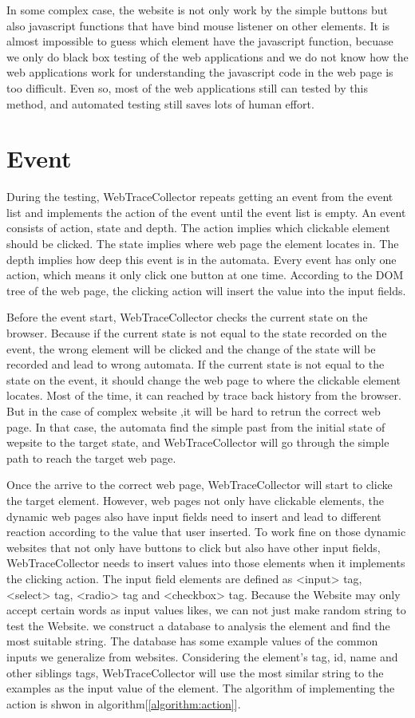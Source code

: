 In some complex case, the website is not only work by the simple buttons 
but also javascript functions that have bind mouse listener on other elements.
It is almost impossible to guess which element have the javascript function,
becuase we only do black box testing of the web applications 
and we do not know how the web applications work 
for understanding the javascript code in the web page is too difficult.
Even so, most of the web applications still can tested by this method,
and automated testing still saves lots of human effort.

\section{Event}

During the testing, WebTraceCollector repeats getting an event from the event list 
and implements the action of the event until the event list is empty.
An event consists of action, state and depth.
The action implies which clickable element should be clicked.
The state implies where web page the element locates in.
The depth implies how deep this event is in the automata.
Every event has only one action, which means it only click one button at one time.
According to the DOM tree of the web page, the clicking action will insert the value into the input fields.

Before the event start, 
WebTraceCollector checks the current state on the browser.
Because if the current state is not equal to the state recorded on the event,
the wrong element will be clicked and the change of the state will be recorded and lead to wrong automata.
If the current state is not equal to the state on the event, 
it should change the web page to where the clickable element locates.
Most of the time, it can reached by trace back history from the browser.
But in the case of complex website ,it will be hard to retrun the correct web page.
In that case, the automata find the simple past from the initial state of wepsite to the target state,
and WebTraceCollector will go through the simple path to reach the target web page.

Once the arrive to the correct web page, WebTraceCollector will start to clicke the target element.
However, web pages not only have clickable elements,
the dynamic web pages also have input fields need to insert and 
lead to different reaction according to the value that user inserted.
To work fine on those dynamic websites that not only have buttons to click but also have other input fields,
WebTraceCollector needs to insert values into those elements when it implements the clicking action.
The input field elements are defined as <input> tag, <select> tag, <radio> tag and <checkbox> tag.
Because the Website may only accept certain words as input values likes, 
we can not just make random string to test the Website.
we construct a database to analysis the element and find the most suitable string.
The database has some example values of the common inputs we generalize from websites.
Considering the element's tag, id, name and other siblings tags,
WebTraceCollector will use the most similar string to the examples as the input value of the element.
The algorithm of implementing the action is shwon in algorithm[\ref{algorithm:action}].


